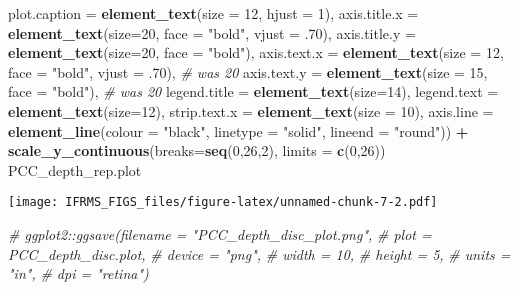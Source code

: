 \documentclass[
]{article}
\newenvironment{Shaded}{\begin{snugshade}}{\end{snugshade}}
\newcommand{\CommentTok}[1]{\textcolor[rgb]{0.56,0.35,0.01}{\textit{#1}}}
\newcommand{\DataTypeTok}[1]{\textcolor[rgb]{0.13,0.29,0.53}{#1}}
\newcommand{\DecValTok}[1]{\textcolor[rgb]{0.00,0.00,0.81}{#1}}
\newcommand{\FloatTok}[1]{\textcolor[rgb]{0.00,0.00,0.81}{#1}}
\newcommand{\KeywordTok}[1]{\textcolor[rgb]{0.13,0.29,0.53}{\textbf{#1}}}
\newcommand{\NormalTok}[1]{#1}
\newcommand{\OperatorTok}[1]{\textcolor[rgb]{0.81,0.36,0.00}{\textbf{#1}}}
\newcommand{\StringTok}[1]{\textcolor[rgb]{0.31,0.60,0.02}{#1}}
\begin{document}
\begin{Shaded}
\begin{Highlighting}[]
        \DataTypeTok{plot.caption =} \KeywordTok{element_text}\NormalTok{(}\DataTypeTok{size =} \DecValTok{12}\NormalTok{, }\DataTypeTok{hjust =} \DecValTok{1}\NormalTok{),}
        \DataTypeTok{axis.title.x =} \KeywordTok{element_text}\NormalTok{(}\DataTypeTok{size=}\DecValTok{20}\NormalTok{, }\DataTypeTok{face =} \StringTok{"bold"}\NormalTok{, }\DataTypeTok{vjust =} \FloatTok{.70}\NormalTok{),}
        \DataTypeTok{axis.title.y =} \KeywordTok{element_text}\NormalTok{(}\DataTypeTok{size=}\DecValTok{20}\NormalTok{, }\DataTypeTok{face =} \StringTok{"bold"}\NormalTok{),}
        \DataTypeTok{axis.text.x =} \KeywordTok{element_text}\NormalTok{(}\DataTypeTok{size =} \DecValTok{12}\NormalTok{, }\DataTypeTok{face =} \StringTok{"bold"}\NormalTok{, }\DataTypeTok{vjust =} \FloatTok{.70}\NormalTok{), }\CommentTok{# was 20}
        \DataTypeTok{axis.text.y =} \KeywordTok{element_text}\NormalTok{(}\DataTypeTok{size =} \DecValTok{15}\NormalTok{, }\DataTypeTok{face =} \StringTok{"bold"}\NormalTok{), }\CommentTok{# was 20}
        \DataTypeTok{legend.title =} \KeywordTok{element_text}\NormalTok{(}\DataTypeTok{size=}\DecValTok{14}\NormalTok{), }
        \DataTypeTok{legend.text =} \KeywordTok{element_text}\NormalTok{(}\DataTypeTok{size=}\DecValTok{12}\NormalTok{),}
        \DataTypeTok{strip.text.x =} \KeywordTok{element_text}\NormalTok{(}\DataTypeTok{size =} \DecValTok{10}\NormalTok{),}
        \DataTypeTok{axis.line =} \KeywordTok{element_line}\NormalTok{(}\DataTypeTok{colour =} \StringTok{"black"}\NormalTok{, }\DataTypeTok{linetype =} \StringTok{"solid"}\NormalTok{, }\DataTypeTok{lineend =} \StringTok{"round"}\NormalTok{)) }\OperatorTok{+}
\StringTok{  }\KeywordTok{scale_y_continuous}\NormalTok{(}\DataTypeTok{breaks=}\KeywordTok{seq}\NormalTok{(}\DecValTok{0}\NormalTok{,}\DecValTok{26}\NormalTok{,}\DecValTok{2}\NormalTok{), }\DataTypeTok{limits =} \KeywordTok{c}\NormalTok{(}\DecValTok{0}\NormalTok{,}\DecValTok{26}\NormalTok{))}
\NormalTok{PCC_depth_rep.plot}
\end{Highlighting}
\end{Shaded}

\texttt{[image: IFRMS\_FIGS\_files/figure-latex/unnamed-chunk-7-2.pdf]}

\begin{Shaded}
\begin{Highlighting}[]
\CommentTok{# ggplot2::ggsave(filename = "PCC_depth_disc_plot.png",}
\CommentTok{#                 plot = PCC_depth_disc.plot,}
\CommentTok{#                 device = "png",}
\CommentTok{#                 width = 10,}
\CommentTok{#                 height = 5, }
\CommentTok{#                 units = "in",}
\CommentTok{#                 dpi = "retina")}
\end{Highlighting}
\end{Shaded}
\end{document}
